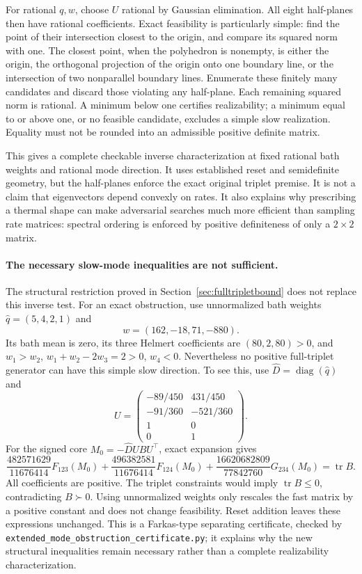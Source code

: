 \documentclass[11pt]{article}
\begin{document}
For rational $q,w$, choose $U$ rational by Gaussian elimination. All eight
half-planes then have rational coefficients. Exact feasibility is particularly
simple: find the point of their intersection closest to the origin, and compare
its squared norm with one. The closest point, when the polyhedron is nonempty,
is either the origin, the orthogonal projection of the origin onto one boundary
line, or the intersection of two nonparallel boundary lines. Enumerate these
finitely many candidates and discard those violating any half-plane. Each
remaining squared norm is rational. A minimum below one certifies realizability;
a minimum equal to or above one, or no feasible candidate, excludes a simple
slow realization. Equality must not be rounded into an admissible positive
definite matrix.

This gives a complete checkable inverse characterization at fixed rational
bath weights and rational mode direction. It uses established reset and
semidefinite geometry, but the half-planes enforce the exact original triplet
premise. It is not a claim that eigenvectors depend convexly on rates. It also
explains why prescribing a thermal shape can make adversarial searches much
more efficient than sampling rate matrices: spectral ordering is enforced by
positive definiteness of only a $2\times2$ matrix.

\paragraph{The necessary slow-mode inequalities are not sufficient.}
The structural restriction proved in Section~\ref{sec:fulltripletbound}
does not replace this inverse test. For an exact obstruction, use
unnormalized bath weights $\widehat q=(5,4,2,1)$ and
\[
w=(162,-18,71,-880).
\]
Its bath mean is zero, its three Helmert coefficients are $(80,2,80)>0$,
and $w_1>w_2$, $w_1+w_2-2w_3=2>0$, $w_4<0$. Nevertheless no positive
full-triplet generator can have this simple slow direction. To see this,
use $\widehat D=\operatorname{diag}(\widehat q)$ and
\[
U=\begin{pmatrix}
-89/450&431/450\\ -91/360&-521/360\\1&0\\0&1
\end{pmatrix}.
\]
For the signed core $M_0=-\widehat DUBU^\top$, exact expansion gives
\[
\frac{482571629}{11676414}F_{123}(M_0)
+\frac{496382581}{11676414}F_{124}(M_0)
+\frac{16620682809}{77842760}G_{234}(M_0)
=\operatorname{tr}B.
\]
All coefficients are positive. The triplet constraints would imply
$\operatorname{tr}B\leq0$, contradicting $B\succ0$. Using unnormalized
weights only rescales the fast matrix by a positive constant and does not
change feasibility. Reset addition leaves these expressions unchanged.
This is a Farkas-type separating certificate, checked by
\texttt{extended\_mode\_obstruction\_certificate.py}; it explains why the
new structural inequalities remain necessary rather than a complete
realizability characterization.
\end{document}
